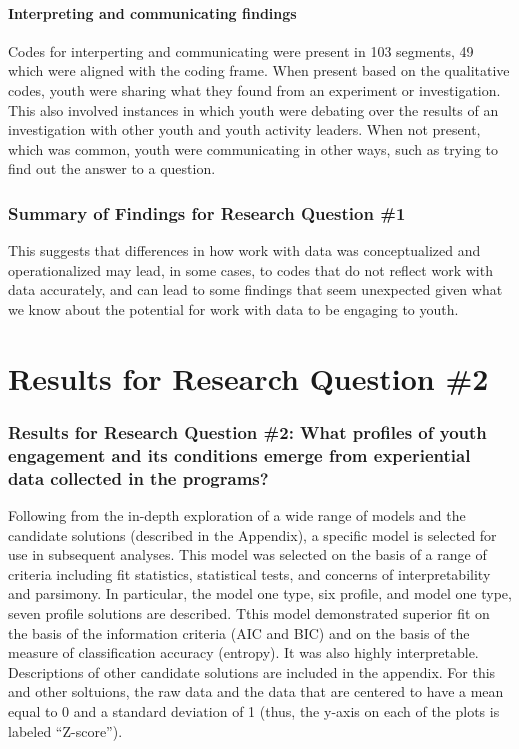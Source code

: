 \documentclass[]{book}
\theoremstyle{definition}
\theoremstyle{definition}
\theoremstyle{definition}
\theoremstyle{remark}
\begin{document}
\subsubsection{Interpreting and communicating
findings}\label{interpreting-and-communicating-findings}

Codes for interperting and communicating were present in 103 segments,
49 which were aligned with the coding frame. When present based on the
qualitative codes, youth were sharing what they found from an experiment
or investigation. This also involved instances in which youth were
debating over the results of an investigation with other youth and youth
activity leaders. When not present, which was common, youth were
communicating in other ways, such as trying to find out the answer to a
question.

\subsection{Summary of Findings for Research Question
\#1}\label{summary-of-findings-for-research-question-1}

This suggests that differences in how work with data was conceptualized
and operationalized may lead, in some cases, to codes that do not
reflect work with data accurately, and can lead to some findings that
seem unexpected given what we know about the potential for work with
data to be engaging to youth.

\chapter{Results for Research Question
\#2}\label{results-for-research-question-2}

\subsection{Results for Research Question \#2: What profiles of youth
engagement and its conditions emerge from experiential data collected in
the
programs?}\label{results-for-research-question-2-what-profiles-of-youth-engagement-and-its-conditions-emerge-from-experiential-data-collected-in-the-programs}

Following from the in-depth exploration of a wide range of models and
the candidate solutions (described in the Appendix), a specific model is
selected for use in subsequent analyses. This model was selected on the
basis of a range of criteria including fit statistics, statistical
tests, and concerns of interpretability and parsimony. In particular,
the model one type, six profile, and model one type, seven profile
solutions are described. Tthis model demonstrated superior fit on the
basis of the information criteria (AIC and BIC) and on the basis of the
measure of classification accuracy (entropy). It was also highly
interpretable. Descriptions of other candidate solutions are included in
the appendix. For this and other soltuions, the raw data and the data
that are centered to have a mean equal to 0 and a standard deviation of
1 (thus, the y-axis on each of the plots is labeled ``Z-score'').
\end{document}
